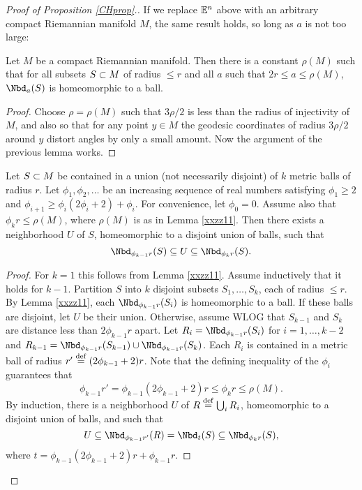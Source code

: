 \begin{proof}[Proof of Proposition \ref{CHprop}.]
If we replace $\mathbb{E}^n$ above with an arbitrary compact Riemannian manifold $M$,
the same result holds, so long as $a$ is not too large:

\begin{lemma} \label{xxzz11}
Let $M$ be a compact Riemannian manifold.
Then there is a constant $\rho(M)$ such that for all
subsets $S\subset M$ of radius $\le r$ and all $a$ such that $2r \le a \le \rho(M)$,
$\Nbd_a(S)$ is homeomorphic to a ball.
\end{lemma}

\begin{proof}
Choose $\rho = \rho(M)$ such that $3\rho/2$ is less than the radius of injectivity of $M$,
and also so that for any point $y\in M$ the geodesic coordinates of radius $3\rho/2$ around
$y$ distort angles by only a small amount.
Now the argument of the previous lemma works.
\end{proof}



\begin{lemma} \label{xx2phi}
Let $S \subset M$ be contained in a union (not necessarily disjoint)
of $k$ metric balls of radius $r$.
Let $\phi_1, \phi_2, \ldots$ be an increasing sequence of real numbers satisfying
$\phi_1 \ge 2$ and $\phi_{i+1} \ge \phi_i(2\phi_i + 2) + \phi_i$.
For convenience, let $\phi_0 = 0$.
Assume also that $\phi_k r \le \rho(M)$,
where $\rho(M)$ is as in Lemma \ref{xxzz11}.
Then there exists a neighborhood $U$ of $S$,
homeomorphic to a disjoint union of balls, such that
\[
	\Nbd_{\phi_{k-1} r}(S) \subeq U \subeq \Nbd_{\phi_k r}(S) .
\]
\end{lemma}

\begin{proof}
For $k=1$ this follows from Lemma \ref{xxzz11}.
Assume inductively that it holds for $k-1$.
Partition $S$ into $k$ disjoint subsets $S_1,\ldots,S_k$, each of radius $\le r$.
By Lemma \ref{xxzz11}, each $\Nbd_{\phi_{k-1} r}(S_i)$ is homeomorphic to a ball.
If these balls are disjoint, let $U$ be their union.
Otherwise, assume WLOG that $S_{k-1}$ and $S_k$ are distance less than $2\phi_{k-1}r$ apart.
Let $R_i = \Nbd_{\phi_{k-1} r}(S_i)$ for $i = 1,\ldots,k-2$ 
and $R_{k-1} = \Nbd_{\phi_{k-1} r}(S_{k-1})\cup \Nbd_{\phi_{k-1} r}(S_k)$.
Each $R_i$ is contained in a metric ball of radius $r' \stackrel{\mathrm{def}}{=} (2\phi_{k-1}+2)r$.
Note that the defining inequality of the $\phi_i$ guarantees that
\[
	\phi_{k-1}r' = \phi_{k-1}(2\phi_{k-1}+2)r \le \phi_k r \le \rho(M) .
\]
By induction, there is a neighborhood $U$ of $R \stackrel{\mathrm{def}}{=} \bigcup_i R_i$, 
homeomorphic to a disjoint union
of balls, and such that
\[
	U \subeq \Nbd_{\phi_{k-1}r'}(R) = \Nbd_{t}(S) \subeq \Nbd_{\phi_k r}(S) ,
\]
where $t = \phi_{k-1}(2\phi_{k-1}+2)r + \phi_{k-1} r$.
\end{proof}


\end{proof}
